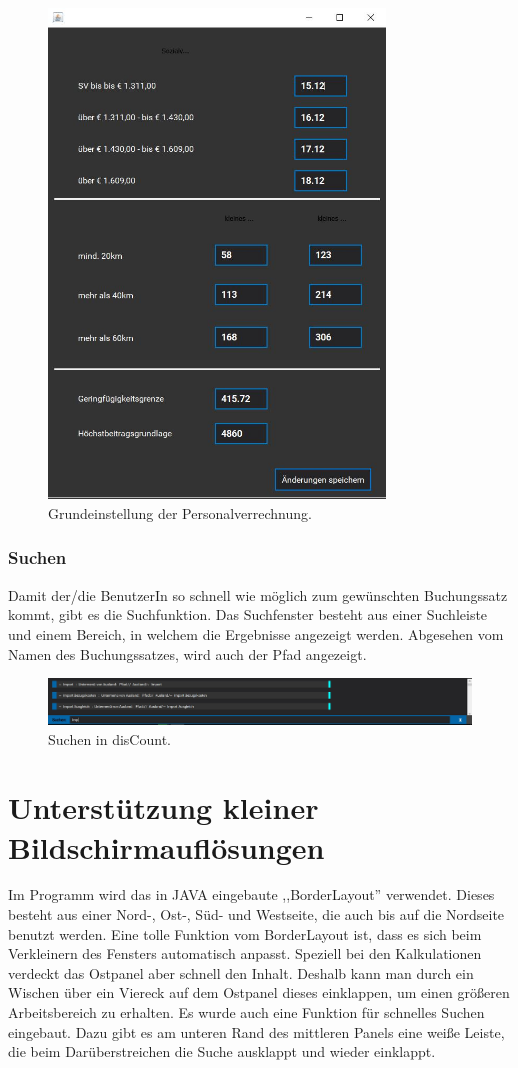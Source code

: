 \documentclass[12pt]{report}
\begin{document}
\begin{figure}[H]
	\centering
	\includegraphics[height=13cm]{images/einstellungen}
	\caption[Einstellungen]{Grundeinstellung der Personalverrechnung.}
\end{figure}

\subsubsection{Suchen}
Damit der/die BenutzerIn so schnell wie möglich zum gewünschten Buchungssatz kommt, gibt es die Suchfunktion. Das Suchfenster besteht aus einer Suchleiste und einem Bereich, in welchem die Ergebnisse angezeigt werden. Abgesehen vom Namen des Buchungssatzes, wird auch der Pfad angezeigt.

\begin{figure}[H]
	\centering
	\includegraphics[width=16cm]{images/suchen}
	\caption[Suchen]{Suchen in disCount.}
\end{figure}

\section{Unterstützung kleiner Bildschirmauflösungen}
Im Programm wird das in JAVA eingebaute ,,BorderLayout'' verwendet. Dieses besteht aus einer Nord-, Ost-, Süd- und Westseite, die auch bis auf die Nordseite benutzt werden. Eine tolle Funktion vom BorderLayout ist, dass es sich beim Verkleinern des Fensters automatisch anpasst. Speziell bei den Kalkulationen verdeckt das Ostpanel aber schnell den Inhalt. Deshalb kann man durch ein Wischen über ein Viereck auf dem Ostpanel dieses einklappen, um einen größeren Arbeitsbereich zu erhalten. Es wurde auch eine Funktion für schnelles Suchen eingebaut. Dazu gibt es am unteren Rand des mittleren Panels eine weiße Leiste, die beim Darüberstreichen die Suche ausklappt und wieder einklappt.
\end{document}
